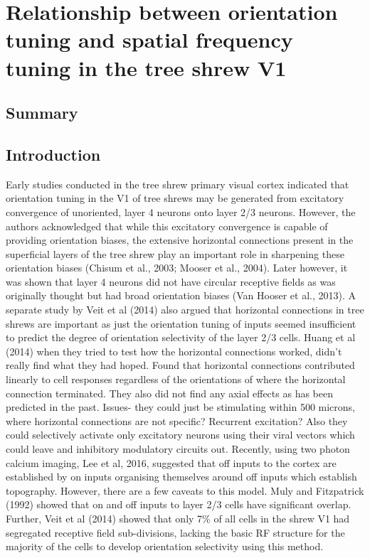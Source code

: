 \chapter {Relationship between orientation tuning and spatial frequency tuning in the tree shrew V1}
\pagebreak
\section{Summary}
\pagebreak
\section{Introduction}

Early studies conducted in the tree shrew primary visual cortex indicated that orientation tuning in the V1 of tree shrews may be generated from excitatory convergence of unoriented, layer 4 neurons onto layer 2/3 neurons. However, the authors acknowledged that while this excitatory convergence is capable of providing orientation biases, the extensive horizontal connections present in the superficial layers of the tree shrew play an important role in sharpening these orientation biases (Chisum et al., 2003; Mooser et al., 2004). Later however, it was shown that layer 4 neurons did not have circular receptive fields as was originally thought but had broad orientation biases (Van Hooser et al., 2013). A separate study by Veit et al (2014) also argued that horizontal connections in tree shrews are important as just the orientation tuning of inputs seemed insufficient to predict the degree of orientation selectivity of the layer 2/3 cells.
Huang et al (2014) when they tried to test how the horizontal connections worked, didn’t really find what they had hoped. Found that horizontal connections contributed linearly to cell responses regardless of the orientations of where the horizontal connection terminated. They also did not find any axial effects as has been predicted in the past. Issues- they  could just be stimulating within 500 microns, where horizontal connections are not specific? Recurrent excitation? Also they could selectively activate only excitatory neurons using their viral vectors which could leave and inhibitory modulatory circuits out.
Recently, using two photon calcium imaging, Lee et al, 2016, suggested that off inputs to the cortex are established by on inputs organising themselves around off inputs which establish topography. However, there are a few caveats to this model. Muly and Fitzpatrick (1992) showed that on and off inputs to layer 2/3 cells have significant overlap. Further, Veit et al (2014) showed that only 7\% of all cells in the shrew V1 had segregated receptive field sub-divisions, lacking the basic RF structure for the majority of the cells to develop orientation selectivity using this method. 



